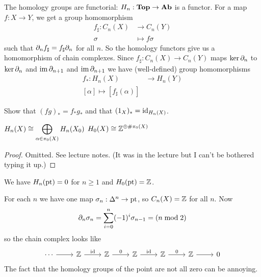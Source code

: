 \begin{rmk}
  The homology groups are functorial: $H_n: \mathbf{Top} \to \mathbf{Ab}$ is a functor.
  For a map $f: X \to Y$, we get a group homomorphism
  \begin{align*}
    f_\sharp: C_n(X) &\to C_n(Y) \\
    \sigma &\mapsto f\sigma
  \end{align*}
  such that $\partial_n f_\sharp = f_\sharp \partial_n$ for all $n$.
  So the homology functors give us a homomorphism of chain complexes.
  Since $f_\sharp: C_n(X) \to C_n(Y)$ maps $\ker\partial_n$ to $\ker\partial_n$ and $\operatorname{im}\partial_{n+1}$ and $\operatorname{im}\partial_{n+1}$ we have (well-defined) group homomorphisms
  \begin{align*}
    f_*: H_n(X) &\to H_n(Y) \\
    [\alpha] \mapsto [f_\sharp(\alpha)]
  \end{align*}
\end{rmk}

\begin{exer}
  Show that $(fg)_* = f_*g_*$ and that $(1_X)_* = \operatorname{id}_{H_n(X)}$.
\end{exer}

\begin{prop}
  \leavevmode
  \begin{enum}
    \io $\displaystyle H_n(X) \cong \bigoplus_{\alpha \in \pi_0(X)} H_n(X_0)$
    \io $\displaystyle H_0(X) \cong \mathbb{Z}^{\oplus \#\pi_0(X)}$
  \end{enum}
\end{prop}

\begin{proof}
  Omitted.
  See lecture notes.
  (It was in the lecture but I can't be bothered typing it up.)
\end{proof}

\begin{exam}
  We have $H_n(\operatorname{pt})=0$ for $n \geq 1$ and $H_0(\operatorname{pt})=\mathbb{Z}$.
  
  For each $n$ we have one map $\sigma_n: \Delta^n \to \operatorname{pt}$, so $C_n(X)=\mathbb{Z}$ for all $n$.
  Now
  \[\partial_n\sigma_n = \sum_{i=0}^n(-1)^i\sigma_{n-1} = (n \bmod 2)\]
  so the chain complex looks like
  \begin{equation*}
    \begin{tikzcd}
      \cdots \ar[r] & \ZZ \ar[r, "\id"] & \ZZ \ar[r, "0"] & \ZZ \ar[r, "\id"] & \ZZ \ar[r, "0"] & \ZZ \ar[r] & 0
    \end{tikzcd}
  \end{equation*}
  The fact that the homology groups of the point are not all zero can be annoying.
\end{exam}

